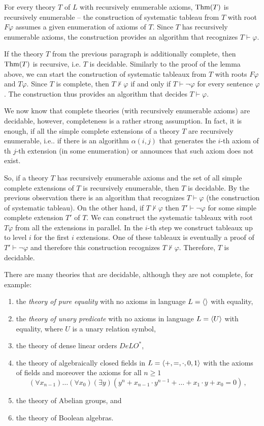 For every theory $T$ of $L$ with recursively enumerable axioms, $\operatorname{Thm}(T)$ is recursively enumerable -- the construction of systematic tableau from $T$ with root $F \varphi$ assumes a given enumeration of axioms of $T$. Since $T$ has recursively enumerable axioms, the construction provides an algorithm that recognizes $T \vdash \varphi$.

If the theory $T$ from the previous paragraph is additionally complete, then $\operatorname{Thm}(T)$ is recursive, i.e. $T$ is decidable. Similarly to the proof of the lemma above, we can start the construction of systematic tableaux from $T$ with roots $F \varphi$ and $T \varphi$. Since $T$ is complete, then $T \nvdash \varphi$ if and only if $T \vdash \neg \varphi$ for every sentence $\varphi$. The construction thus provides an algorithm that decides $T \vdash \varphi$.

We now know that complete theories (with recursively enumerable axioms) are decidable, however, completeness is a rather strong assumption. In fact, it is enough, if all the simple complete extensions of a theory $T$ are recursively enumerable, i.e.. if there is an algorithm $\alpha(i,j)$ that generates the $i$-th axiom of th $j$-th extension (in some enumeration) or announces that such axiom does not exist.

So, if a theory $T$ has recursively enumerable axioms and the set of all simple complete extensions of $T$ is recursively enumerable, then $T$ is decidable. By the previous observation there is an algorithm that recognizes $T \vdash \varphi$ (the construction of systematic tableau). On the other hand, if $T \nvdash \varphi$ then $T' \vdash \neg \varphi$ for some simple complete extension $T'$ of $T$. We can construct the systematic tableaux with root $T \varphi$ from all the extensions in parallel. In the $i$-th step we construct tableaux up to level $i$ for the first $i$ extensions. One of these tableaux is eventually a proof of $T' \vdash \neg \varphi$ and therefore this construction recognizes $T \nvdash \varphi$. Therefore, $T$ is decidable.

There are many theories that are decidable, although they are not complete, for example:
\begin{enumerate}
  \item the \emph{theory of pure equality} with no axioms in language $L = \langle  \rangle$ with equality,
  \item the \emph{theory of unary predicate} with no axioms in language $L = \langle U \rangle$ with equality, where $U$ is a unary relation symbol,
  \item the theory of dense linear orders $DeLO^*$,
  \item the theory of algebraically closed fields in $L = \langle +, =, \cdot, 0, 1 \rangle$ with the axioms of fields and moreover the axioms for all $n \geq 1$ $$(\forall x_{n-1})\dots(\forall x_0)(\exists y)(y^n + x_{n-1}\cdot y^{n-1} + \dots + x_1\cdot y + x_0 = 0)\,,$$
  \item the theory of Abelian groups, and
  \item the theory of Boolean algebras.
\end{enumerate}


